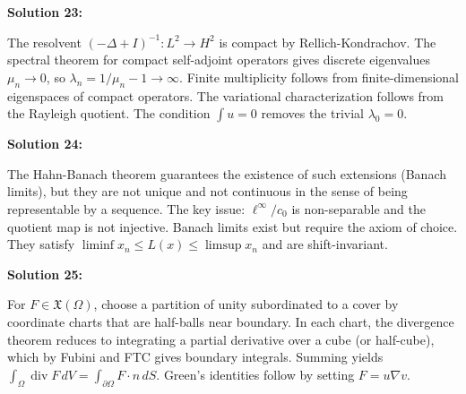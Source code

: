 \documentclass[12pt,a4paper]{exam}
\begin{document}
\vspace{0.5cm}

\textbf{Solution 23:}

The resolvent $(-\Delta + I)^{-1}: L^2 \to H^2$ is compact by Rellich-Kondrachov. The spectral theorem for compact self-adjoint operators gives discrete eigenvalues $\mu_n \to 0$, so $\lambda_n = 1/\mu_n - 1 \to \infty$. Finite multiplicity follows from finite-dimensional eigenspaces of compact operators. The variational characterization follows from the Rayleigh quotient. The condition $\int u = 0$ removes the trivial $\lambda_0 = 0$.

\vspace{0.5cm}

\textbf{Solution 24:}

The Hahn-Banach theorem guarantees the existence of such extensions (Banach limits), but they are not unique and not continuous in the sense of being representable by a sequence. The key issue: $\ell^\infty / c_0$ is non-separable and the quotient map is not injective. Banach limits exist but require the axiom of choice. They satisfy $\liminf x_n \leq L(x) \leq \limsup x_n$ and are shift-invariant.

\vspace{0.5cm}

\textbf{Solution 25:}

For $F \in \mathfrak{X}(\Omega)$, choose a partition of unity subordinated to a cover by coordinate charts that are half-balls near boundary. In each chart, the divergence theorem reduces to integrating a partial derivative over a cube (or half-cube), which by Fubini and FTC gives boundary integrals. Summing yields $\int_\Omega \operatorname{div} F \, dV = \int_{\partial\Omega} F \cdot n \, dS$. Green's identities follow by setting $F = u \nabla v$.

\vspace{0.5cm}
\end{document}
